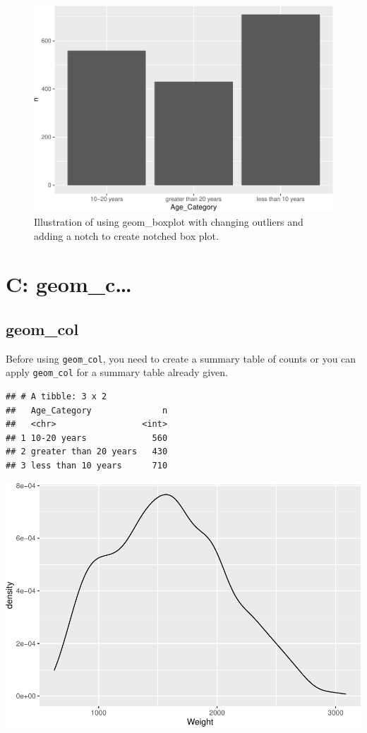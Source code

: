 \documentclass[
]{book}
\begin{document}
\begin{figure}
\centering
\includegraphics{Data-Visualisation-geom-Encyclopedia_files/figure-latex/unnamed-chunk-29-1.pdf}
\caption{\label{fig:unnamed-chunk-29}Illustration of using geom\_boxplot with changing outliers and adding a notch to create notched box plot.}
\end{figure}

\hypertarget{c-geom_c}{%
\chapter{C: geom\_c\ldots{}}\label{c-geom_c}}

\hypertarget{geom_col}{%
\section{geom\_col}\label{geom_col}}

Before using \texttt{geom\_col}, you need to create a summary table of counts or you can apply \texttt{geom\_col} for a summary table already given.

\begin{verbatim}
## # A tibble: 3 x 2
##   Age_Category              n
##   <chr>                 <int>
## 1 10-20 years             560
## 2 greater than 20 years   430
## 3 less than 10 years      710
\end{verbatim}

\includegraphics{Data-Visualisation-geom-Encyclopedia_files/figure-latex/unnamed-chunk-31-1.pdf}
\end{document}
